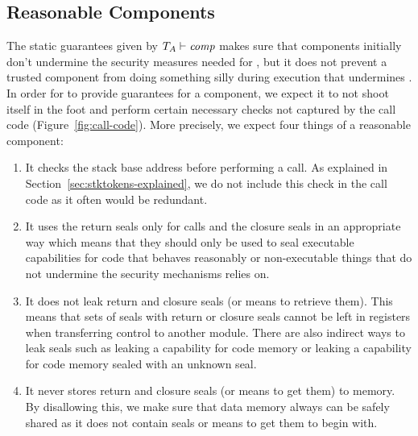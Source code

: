 \documentclass{jfp}
\renewcommand{\comp}{\var{comp}}
\newcommand{\wdjud}[2][ ]{#1 \vdash #2}
\begin{document}
\subsection{Reasonable Components}
\label{sec:reasonable-components}
The static guarantees given by $\wdjud[\ta]{\comp}$ makes sure that components initially don't undermine the security measures needed for \stktokens{}, but it does not prevent a trusted component from doing something silly during execution that undermines \stktokens{}.
In order for \stktokens{} to provide guarantees for a component, we expect it to not shoot itself in the foot and perform certain necessary checks not captured by the call code (Figure~\ref{fig:call-code}).
More precisely, we expect four things of a reasonable component:
\begin{enumerate}[label=(\arabic*)]
\item It checks the stack base address before performing a call.
As explained in Section~\ref{sec:stktokens-explained}, we do not include this check in the call code as it often would be redundant.
\item It uses the return seals only for calls and the closure seals in an appropriate way which means that they should only be used to seal executable capabilities for code that behaves reasonably or non-executable things that do not undermine the security mechanisms \stktokens{} relies on.
\item It does not leak return and closure seals (or means to retrieve them).
This means that sets of seals with return or closure seals cannot be left in registers when transferring control to another module.
There are also indirect ways to leak seals such as leaking a capability for code memory or leaking a capability for code memory sealed with an unknown seal.
\item It never stores return and closure seals (or means to get them) to memory.
By disallowing this, we make sure that data memory always can be safely shared as it does not contain seals or means to get them to begin with.
\end{enumerate}
\end{document}
